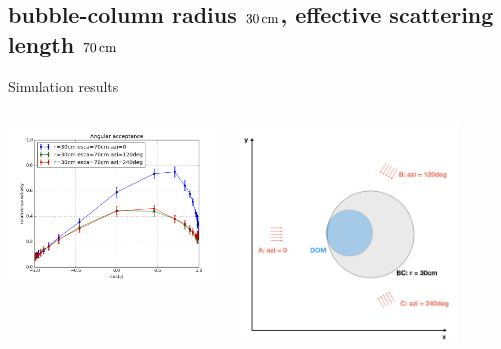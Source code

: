 \subsection{bubble-column radius $30\text{\,cm}$, effective scattering length $70\text{\,cm}$}
\begin{frame}[fragile]{Simulation results}
  \begin{columns}
    \begin{column}{0.5\textwidth}
      \includegraphics[width=\textwidth]{img/summer_scenario_r30cm_esca70cm}
    \end{column}
    \begin{column}{0.5\textwidth}
      \includegraphics[width=0.8\textwidth]{img/summerscenario-005}
    \end{column}
  \end{columns}


\end{frame}
